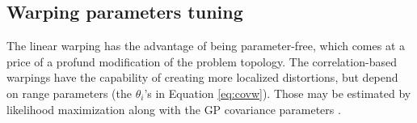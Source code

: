 



% 
% 
% 

\subsection{Warping parameters tuning}
The linear warping has the advantage of being parameter-free, which comes at a price of a profund modification of the 
problem topology. The correlation-based warpings have the capability of creating more localized distortions, but depend 
on range parameters (the $\theta_i$'s in Equation \ref{eq:covw}). Those may be estimated by likelihood maximization
along with the GP covariance parameters \cite{snoek2014input,marmin2018warped}.

